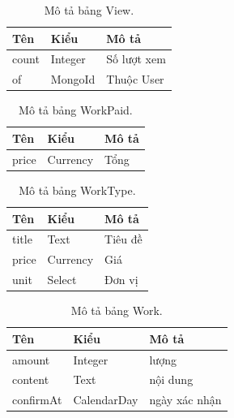 \documentclass[11pt]{report}
\begin{document}
	
	\begin{table}[h!]
		\begin{center}
			\caption{Mô tả bảng View.}
			\begin{tabularx}{0.6\textwidth}{ |l|l|X| } 
				\hline
				Tên & Kiểu & Mô tả \\
				\hline
				count & Integer & Số lượt xem \\
				of & MongoId & Thuộc User \\ 
				\hline
			\end{tabularx}
			\label{table:View}
		\end{center}
	\end{table}
	
	
	\begin{table}[h!]
		\begin{center}
			\caption{Mô tả bảng WorkPaid.}
			\begin{tabularx}{0.6\textwidth}{ |l|l|X| } 
				\hline
				Tên & Kiểu & Mô tả \\
				\hline
				price & Currency & Tổng \\ 
				\hline
			\end{tabularx}
			\label{table:WorkPaid}
		\end{center}
	\end{table}
	
	
	\begin{table}[h!]
		\begin{center}
			\caption{Mô tả bảng WorkType.}
			\begin{tabularx}{0.6\textwidth}{ |l|l|X| } 
				\hline
				Tên & Kiểu & Mô tả \\
				\hline
				title & Text & Tiêu đề \\
				price & Currency & Giá \\
				unit & Select & Đơn vị \\ 
				\hline
			\end{tabularx}
			\label{table:WorkType}
		\end{center}
	\end{table}
	
	\clearpage
	\begin{table}[h!]
		\begin{center}
			\caption{Mô tả bảng Work.}
			\begin{tabularx}{0.6\textwidth}{ |l|l|X| } 
				\hline
				Tên & Kiểu & Mô tả \\
				\hline
				amount & Integer & lượng \\
				content & Text & nội dung \\
				confirmAt & CalendarDay & ngày xác nhận \\ 
				\hline
			\end{tabularx}
			\label{table:Work}
		\end{center}
	\end{table}
	
\end{document}
